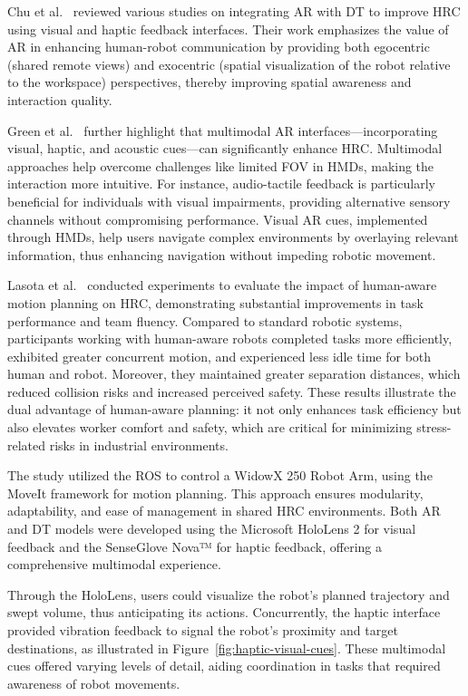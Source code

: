 Chu et al.~\cite{CHU2023313} reviewed various studies on integrating \ac{AR} with \ac{DT} to improve \ac{HRC} using visual and haptic feedback interfaces. Their work emphasizes the value of \ac{AR} in enhancing human-robot communication by providing both egocentric (shared remote views) and exocentric (spatial visualization of the robot relative to the workspace) perspectives, thereby improving spatial awareness and interaction quality. 

Green et al.~\cite{doi:10.5772/5664} further highlight that multimodal \ac{AR} interfaces—incorporating visual, haptic, and acoustic cues—can significantly enhance \ac{HRC}. Multimodal approaches help overcome challenges like limited \ac{FOV} in \ac{HMDs}, making the interaction more intuitive. For instance, audio-tactile feedback is particularly beneficial for individuals with visual impairments, providing alternative sensory channels without compromising performance. Visual \ac{AR} cues, implemented through \ac{HMDs}, help users navigate complex environments by overlaying relevant information, thus enhancing navigation without impeding robotic movement.

Lasota et al.~\cite{doi:10.1177/0018720814565188} conducted experiments to evaluate the impact of human-aware motion planning on \ac{HRC}, demonstrating substantial improvements in task performance and team fluency. Compared to standard robotic systems, participants working with human-aware robots completed tasks more efficiently, exhibited greater concurrent motion, and experienced less idle time for both human and robot. Moreover, they maintained greater separation distances, which reduced collision risks and increased perceived safety. These results illustrate the dual advantage of human-aware planning: it not only enhances task efficiency but also elevates worker comfort and safety, which are critical for minimizing stress-related risks in industrial environments.

The study utilized the \ac{ROS} to control a WidowX 250 Robot Arm, using the MoveIt framework for motion planning. This approach ensures modularity, adaptability, and ease of management in shared \ac{HRC} environments. Both \ac{AR} and \ac{DT} models were developed using the Microsoft HoloLens 2 for visual feedback and the SenseGlove Nova™ for haptic feedback, offering a comprehensive multimodal experience.

Through the HoloLens, users could visualize the robot's planned trajectory and swept volume, thus anticipating its actions. Concurrently, the haptic interface provided vibration feedback to signal the robot's proximity and target destinations, as illustrated in Figure~\ref{fig:haptic-visual-cues}. These multimodal cues offered varying levels of detail, aiding coordination in tasks that required awareness of robot movements.

